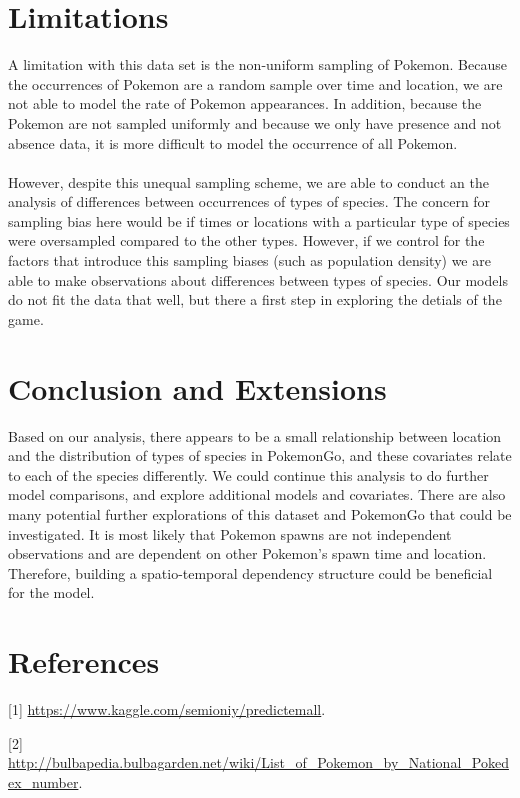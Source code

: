 \documentclass{article}
\begin{document}
\section{Limitations}

A limitation with this data set is the non-uniform sampling of Pokemon. Because the occurrences of Pokemon are a random sample over time and location, we are not able to model the rate of Pokemon appearances. In addition, because the Pokemon are not sampled uniformly and because we only have presence and not absence data, it is more difficult to model the occurrence of all Pokemon. \\ 
\\ 
However, despite this unequal sampling scheme, we are able to conduct an the analysis of differences between occurrences of types of species. The concern for sampling bias here would be if times or locations with a particular type of species were oversampled compared to the other types. However, if we control for the factors that introduce this sampling biases (such as population density) we are able to make observations about differences between types of species. Our models do not fit the data that well, but there a first step in exploring the detials of the game.

\section{Conclusion and Extensions}

Based on our analysis, there appears to be a small relationship between location and the distribution of types of species in PokemonGo, and these covariates relate to each of the species differently. We could continue this analysis to do further model comparisons, and explore additional models and covariates. There are also many potential further explorations of this dataset and PokemonGo that could be investigated. It is most likely that Pokemon spawns are not independent observations and are dependent on other Pokemon's spawn time and location. Therefore, building a spatio-temporal dependency structure could be beneficial for the model. 

\newpage
\section{References}

\hypertarget{Ref1}{[1] \url{https://www.kaggle.com/semioniy/predictemall}.}

\noindent \hypertarget{Ref2}{[2] \url{http://bulbapedia.bulbagarden.net/wiki/List_of_Pokemon_by_National_Pokedex_number}.}
\end{document}
